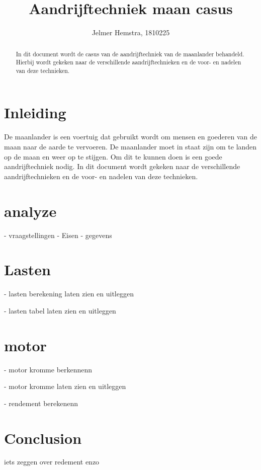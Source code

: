 \documentclass{article}
\title{Aandrijftechniek maan casus}
\author{Jelmer Hemstra, 1810225}
\begin{document}
    \maketitle

    \begin{abstract}
        In dit document wordt de casus van de aandrijftechniek van de maanlander behandeld. Hierbij wordt gekeken naar de verschillende aandrijftechnieken en de voor- en nadelen van deze technieken.

    \end{abstract}


\section{Inleiding}
De maanlander is een voertuig dat gebruikt wordt om mensen en goederen van de maan naar de aarde te vervoeren. 
De maanlander moet in staat zijn om te landen op de maan en weer op te stijgen. 
Om dit te kunnen doen is een goede aandrijftechniek nodig. 
In dit document wordt gekeken naar de verschillende aandrijftechnieken en de voor- en nadelen van deze technieken.

\section{analyze}
- vraagstellingen 
- Eisen
- gegevens



\section{Lasten}
- lasten berekening laten zien en uitleggen


- lasten tabel laten zien en uitleggen






\section{motor}
- motor kromme berkennenn

- motor kromme laten zien en uitleggen

- rendement berekenenn


\section{Conclusion}

iets zeggen over redement enzo
\end{document}
